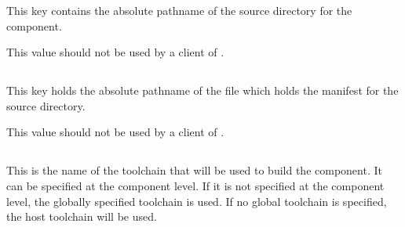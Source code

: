 This key contains the absolute pathname of the source directory for
the component.

This value should not be used by a client of \lmsbw.


\subsection{}\label{variables:source-mtree-manifest}

This key holds the absolute pathname of the file which holds the
\mtree manifest for the source directory.

This value should not be used by a client of \lmsbw.


\subsection{}\label{variables:toolchain}

This is the name of the toolchain that will be used to build the
component.  It can be specified at the component level.  If it is not
specified at the component level, the globally specified toolchain is
used.  If no global toolchain is specified, the host toolchain will be
used.

